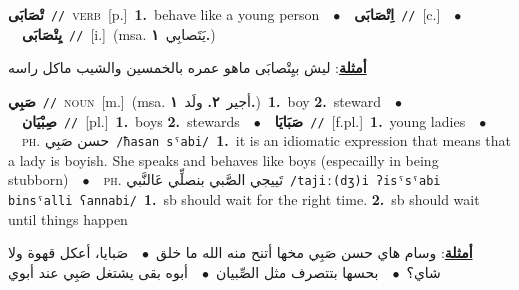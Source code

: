 \documentclass[10pt,a4paper,twoside]{article} %
\begin{document}
\begin{multicols}{2}
{\setlength\topsep{0pt}\textbf{\foreignlanguage{arabic}{تْصَابَى}}\ {\color{gray}\texttt{//}\color{black}}\ \textsc{verb}\ [p.]\ \textbf{1.}~behave like a young person\ \ $\bullet$\ \ \setlength\topsep{0pt}\textbf{\foreignlanguage{arabic}{اِتْصَابَى}}\ {\color{gray}\texttt{//}\color{black}}\ [c.]\ \ $\bullet$\ \ \setlength\topsep{0pt}\textbf{\foreignlanguage{arabic}{يِتْصَابَى}}\ {\color{gray}\texttt{//}\color{black}}\ [i.]\ \color{gray}(msa. \foreignlanguage{arabic}{يَتَصابِي}~\foreignlanguage{arabic}{\textbf{١.}})\color{black}\  \begin{flushright}\color{gray}\foreignlanguage{arabic}{\textbf{\underline{\foreignlanguage{arabic}{أمثلة}}}: ليش بيِتْصابَى ماهو عمره بالخمسين والشيب ماكل راسه}\end{flushright}\color{black}} \vspace{2mm}

{\setlength\topsep{0pt}\textbf{\foreignlanguage{arabic}{صَبِي}}\ {\color{gray}\texttt{//}\color{black}}\ \textsc{noun}\ [m.]\ \color{gray}(msa. \foreignlanguage{arabic}{أجير}~\foreignlanguage{arabic}{\textbf{٢.}}  \foreignlanguage{arabic}{ولَد}~\foreignlanguage{arabic}{\textbf{١.}})\color{black}\ \textbf{1.}~boy  \textbf{2.}~steward\ \ $\bullet$\ \ \setlength\topsep{0pt}\textbf{\foreignlanguage{arabic}{صِبْيَان}}\ {\color{gray}\texttt{//}\color{black}}\ [pl.]\ \textbf{1.}~boys  \textbf{2.}~stewards\ \ $\bullet$\ \ \setlength\topsep{0pt}\textbf{\foreignlanguage{arabic}{صَبَايَا}}\ {\color{gray}\texttt{//}\color{black}}\ [f.pl.]\ \textbf{1.}~young ladies\ \ $\bullet$\ \ \textsc{ph.} \color{gray} \foreignlanguage{arabic}{حسن صَبِي}\color{black}\ {\color{gray}\texttt{/{\sffamily ħasan sˤabi}/}\color{black}}\ \textbf{1.}~it is an idiomatic expression that means that a lady is boyish. She speaks and behaves like boys (especailly in being stubborn)\ \ $\bullet$\ \ \textsc{ph.} \color{gray} \foreignlanguage{arabic}{تَييجي الصَّبي بنصلِّي عَالنَّبي}\color{black}\ {\color{gray}\texttt{/{\sffamily tajiː(dʒ)i ʔisˤsˤabi binsˤalli ʕannabi}/}\color{black}}\ \textbf{1.}~sb should wait for the right time.  \textbf{2.}~sb should wait until things happen\  \begin{flushright}\color{gray}\foreignlanguage{arabic}{\textbf{\underline{\foreignlanguage{arabic}{أمثلة}}}: وسام هاي حسن صَبِي مخها أتنح منه الله ما خلق\ $\bullet$\ \  صَبايا، أعكل قهوة ولا شاي؟\ $\bullet$\ \  بحسها بتتصرف مثل الصِّبيان\ $\bullet$\ \  أبوه بقى يشتغل صَبِي عند أبوي}\end{flushright}\color{black}} \vspace{2mm}


\end{multicols}
\end{document}
